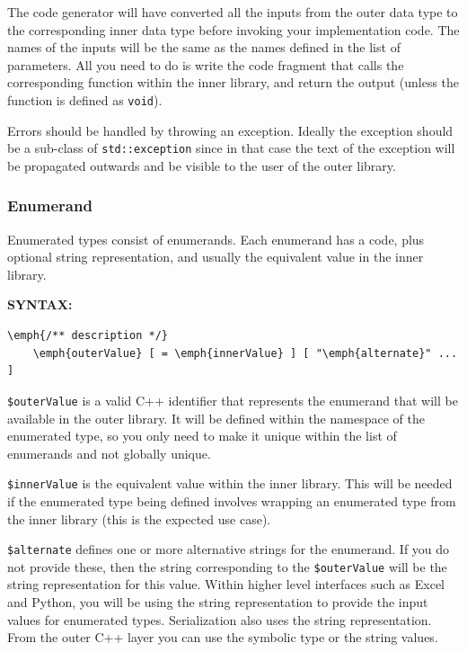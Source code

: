 The code generator will have converted all the inputs from the outer data type to the corresponding inner data type before invoking your implementation code. The names of the inputs will be the same as the names defined in the list of parameters. All you need to do is write the code fragment that calls the corresponding function within the inner library, and return the output (unless the function is defined as \texttt{void}).

Errors should be handled by throwing an exception. Ideally the exception should be a sub-class of \texttt{std::exception} since in that case the text of the exception will be propagated outwards and be visible to the user of the outer library.


\subsubsection{Enumerand} \label{enumerand}

Enumerated types consist of enumerands. Each enumerand has a code, plus optional string representation, and usually the equivalent value in the inner library.

\textbf{SYNTAX:}
\nopagebreak
\begin{Verbatim}[commandchars=\\\{\}]
    \emph{/** description */}
    \emph{outerValue} [ = \emph{innerValue} ] [ "\emph{alternate}" ... ] 
\end{Verbatim}

\texttt{\$outerValue} is a valid C++ identifier that represents the enumerand that will be available in the outer library. It will be defined within the namespace of the enumerated type, so you only need to make it unique within the list of enumerands and not globally unique.

\texttt{\$innerValue} is the equivalent value within the inner library. This will be needed if the enumerated type being defined involves wrapping an enumerated type from the inner library (this is the expected use case).

\texttt{\$alternate} defines one or more alternative strings for the enumerand. If you do not provide these, then the string corresponding to the \texttt{\$outerValue} will be the string representation for this value. Within higher level interfaces such as Excel and Python, you will be using the string representation to provide the input values for enumerated types. Serialization also uses the string representation. From the outer C++ layer you can use the symbolic type or the string values.


